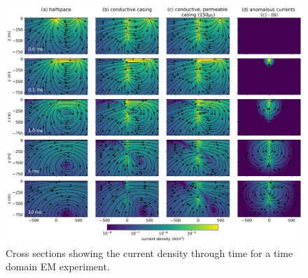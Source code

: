 \begin{figure}[H]
    \begin{center}
    \includegraphics[width=\columnwidth]{figures/tdem-cross-section-currents.png}
    \end{center}
\caption{Cross sections showing the current density through time for a time domain EM experiment.
}
\label{fig:tdem-cross-section-currents}
\end{figure}



